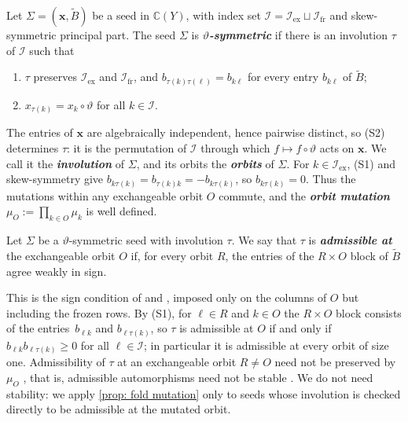 \documentclass[a4paper]{amsart}
\numberwithin{equation}{section}
\theoremstyle{definition}
\theoremstyle{remark}
\newcommand{\bbC}{\mathbb{C}}
\newcommand{\mcI}{\mathcal{I}}
\newcommand{\bx}{\mathbf{x}}
\newcommand{\tB}{\widetilde{B}}
\newcommand{\vt}{\vartheta}
\newcommand{\ex}{\mathrm{ex}}
\newcommand{\fr}{\mathrm{fr}}
\newcommand{\newword}[1]{\textbf{\emph{#1}}}
\begin{document}
\begin{definition}
  \label{def: symmetric seed}
  Let $\Sigma=(\bx,\tB)$ be a seed in $\bbC(Y)$, with index set $\mcI=\mcI_\ex\sqcup\mcI_\fr$ and skew-symmetric principal part.
  The seed $\Sigma$ is \newword{$\vt$-symmetric} if there is an involution $\tau$ of $\mcI$ such that
  \begin{enumerate}[(S1)]
    \item $\tau$ preserves $\mcI_\ex$ and $\mcI_\fr$, and $b_{\tau(k)\tau(\ell)}=b_{k\ell}$ for every entry $b_{k\ell}$ of $\tB$;
    \item $x_{\tau(k)}=x_k\circ\vt$ for all $k\in\mcI$.
  \end{enumerate}
\end{definition}

The entries of $\bx$ are algebraically independent, hence pairwise distinct, so (S2) determines $\tau$: it is the permutation of $\mcI$ through which $f\mapsto f\circ\vt$ acts on $\bx$.
We call it the \newword{involution} of $\Sigma$, and its orbits the \newword{orbits} of $\Sigma$.
For $k\in\mcI_\ex$, (S1) and skew-symmetry give $b_{k\tau(k)}=b_{\tau(k)k}=-b_{k\tau(k)}$, so $b_{k\tau(k)}=0$.
Thus the mutations within any exchangeable orbit $O$ commute, and the \newword{orbit mutation} $\mu_O:=\prod_{k\in O}\mu_k$ is well defined.

\begin{definition}
  \label{def: admissible}
  Let $\Sigma$ be a $\vt$-symmetric seed with involution $\tau$.
  We say that $\tau$ is \newword{admissible at} the exchangeable orbit $O$ if, for every orbit $R$, the entries of the $R\times O$ block of $\tB$ agree weakly in sign.
\end{definition}

This is the sign condition of \cite[(5.2)]{NS14} and \cite[Definition~2.3.2(ii)]{Vie18}, imposed only on the columns of $O$ but including the frozen rows.
By (S1), for $\ell\in R$ and $k\in O$ the $R\times O$ block consists of the entries~$b_{\ell k}$ and $b_{\ell\tau(k)}$, so $\tau$ is admissible at $O$ if and only if $b_{\ell k}b_{\ell\tau(k)}\ge0$ for all $\ell\in\mcI$; in particular it is admissible at every orbit of size one.
Admissibility of $\tau$ at an exchangeable orbit $R\neq O$ need not be preserved by $\mu_O$ \cite[Remark~2.18]{Dup08}, that is, admissible automorphisms need not be stable \cite[Definition~2.3.4]{Vie18}.
We do not need stability: we apply \cref{prop: fold mutation} only to seeds whose involution is checked directly to be admissible at the mutated orbit.
\end{document}
